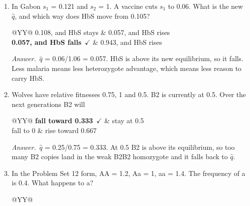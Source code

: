 \documentclass[11pt]{article}
\newcommand{\keyans}[1]{\par\medskip\noindent\textit{Answer.}\ #1\par\medskip}
\begin{document}
\begin{enumerate}[label=\textbf{\arabic*.}, leftmargin=2em, itemsep=1.4em]
\begin{tabularx}{\linewidth}{@{}YYYY@{}}
\end{tabularx}
\keyans{\(s_1\) = 0.25 for AA and \(s_2\) = 0.5 for aa. \(\hat{q}\) for a = 0.25/0.75 = 0.333, so \(\hat{p}\) for A = 0.667. The question asked for A. The trap is answering \(\hat{q}\).}
\item In Gabon \(s_1\) = 0.121 and \(s_2\) = 1. A vaccine cuts \(s_1\) to 0.06. What is the new \(\hat{q}\), and which way does HbS move from 0.105?
\nopagebreak\par{}
\par\smallskip\noindent\begin{tabularx}{\linewidth}{@{}YY@{}}
0.108, and HbS stays & 0.057, and HbS rises \\[3pt]
\textbf{0.057, and HbS falls}\ \(\checkmark\) & 0.943, and HbS rises \\
\end{tabularx}
\keyans{\(\hat{q}\) = 0.06/1.06 = 0.057. HbS is above its new equilibrium, so it falls. Less malaria means less heterozygote advantage, which means less reason to carry HbS.}
\item Wolves have relative fitnesses 0.75, 1 and 0.5. B2 is currently at 0.5. Over the next generations B2 will
\nopagebreak\par{}
\par\smallskip\noindent\begin{tabularx}{\linewidth}{@{}YY@{}}
\textbf{fall toward 0.333}\ \(\checkmark\) & stay at 0.5 \\[3pt]
fall to 0 & rise toward 0.667 \\
\end{tabularx}
\keyans{\(\hat{q}\) = 0.25/0.75 = 0.333. At 0.5 B2 is above its equilibrium, so too many B2 copies land in the weak B2B2 homozygote and it falls back to \(\hat{q}\).}
\item In the Problem Set 12 form, AA = 1.2, Aa = 1, aa = 1.4. The frequency of a is 0.4. What happens to a?
\nopagebreak\par{}
\par\smallskip\noindent\begin{tabularx}{\linewidth}{@{}YY@{}}

\end{tabularx}
\end{enumerate}
\end{document}
